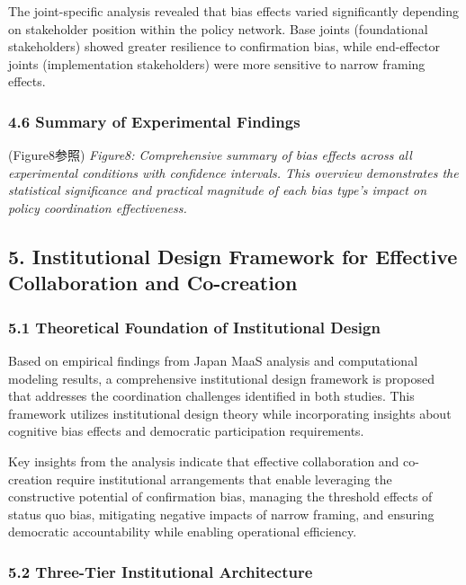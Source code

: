 The joint-specific analysis revealed that bias effects varied significantly depending on stakeholder position within the policy network. Base joints (foundational stakeholders) showed greater resilience to confirmation bias, while end-effector joints (implementation stakeholders) were more sensitive to narrow framing effects.

\subsubsection{4.6 Summary of Experimental Findings}\label{summary-of-experimental-findings}

(Figure8参照) \emph{Figure8: Comprehensive summary of bias effects across all experimental conditions with confidence intervals. This overview demonstrates the statistical significance and practical magnitude of each bias type's impact on policy coordination effectiveness.}

\subsection{5. Institutional Design Framework for Effective Collaboration and Co-creation}\label{institutional-design-framework-for-effective-collaboration-and-co-creation}

\subsubsection{5.1 Theoretical Foundation of Institutional Design}\label{theoretical-foundation-of-institutional-design}

Based on empirical findings from Japan MaaS analysis and computational modeling results, a comprehensive institutional design framework is proposed that addresses the coordination challenges identified in both studies. This framework utilizes institutional design theory while incorporating insights about cognitive bias effects and democratic participation requirements.

Key insights from the analysis indicate that effective collaboration and co-creation require institutional arrangements that enable leveraging the constructive potential of confirmation bias, managing the threshold effects of status quo bias, mitigating negative impacts of narrow framing, and ensuring democratic accountability while enabling operational efficiency.

\subsubsection{5.2 Three-Tier Institutional Architecture}\label{three-tier-institutional-architecture}

